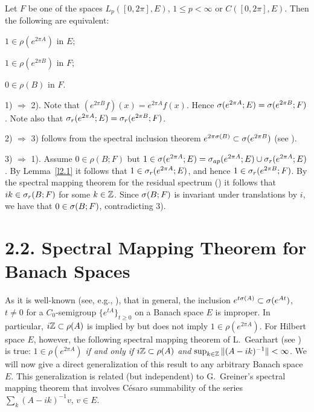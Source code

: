 \begin{thm}
Let
$F$ be one of the spaces
$L_p ([0,2\pi],E)$, $1\leq p < \infty$
or  $C([0,2\pi],E)$.
Then the following are equivalent:
\begin{list}{)}{}
\item $1\in \rho (e^{2\pi A} )$ in $E$;
\item $1\in \rho (e^{2\pi B})$ in $F$;
\item $0\in\rho(B)$ in $F$.
\end{list}
\end{thm}

\begin{pf}
1) $\Rightarrow$ 2). Note that $(e^{2\pi B}f)(x) =e^{2\pi A} f(x)$.  Hence
$\sigma (e^{2\pi A}; E)=\sigma (e^{2\pi B}; F)$.
Note also that $\sigma_r (e^{2\pi
A}; E)=\sigma_r (e^{2\pi B}; F)$.

2) $\Rightarrow$ 3) follows from the spectral inclusion theorem
$e^{2\pi\sigma (B)}\subset \sigma(e^{2\pi B})$ (see \cite[p. 45]{24}).

3) $\Rightarrow$ 1).  Assume $0\in \rho (B; F)$ but
$1 \in \sigma (e^{2\pi A}; E)
=\sigma_{ap} (e^{2\pi A}; E) \cup \sigma_r (e^{2\pi A}; E)$.
By Lemma~\ref{l2.1} it follows that
$1\in \sigma _r (e^{2\pi A}; E)$, and hence
$1\in\sigma_r (e^{2\pi B}; F)$.  By the spectral
mapping theorem for the residual spectrum (\cite[Theorem~2.5~(ii)]{24})
it follows that $ik\in\sigma_r (B; F)$ for some $k\in{\Bbb{Z}}$.
Since $\sigma(B; F)$ is
invariant under translations by $i$, we have that $0\in \sigma (B; F)$,
contradicting 3).
\end{pf}


\section*{2.2. Spectral Mapping Theorem for Banach Spaces}\label{sub2.2}

As it is well-known (see, e.g., \cite[p.~82--89]{21}),
that in general, the inclusion
$e^{t \sigma(A)} \subset \sigma (e^{At}) $, $t\neq 0$
for a
$C_0$-semigroup $\{e^{tA}\}_{t\geq 0}$ on a Banach space $E$
is improper. In
particular, $i{\Bbb{Z}} \subset \rho (A)$ is implied by but does not imply
$1\in \rho (e^{2\pi A})$.  For Hilbert space $E$, however, the following
spectral mapping theorem of L.~Gearhart (see \cite[p.~95]{21}) is true:
{\it $1\in \rho (e^{2\pi A})$ if and only if $i{\Bbb{Z}} \subset \rho (A)$ and
$\sup_{k\in {\Bbb{Z}}} \| (A-ik)^{-1}\|< \infty$\/}.
We will now give a direct
generalization of this result to any arbitrary Banach space $E$.
This generalization
is related (but independent) to G.~Greiner's spectral mapping
theorem \cite[p.~94]{21} that involves C\'esaro summability of the
series $\sum_k (A-ik)^{-1}v$, $v\in E$.

